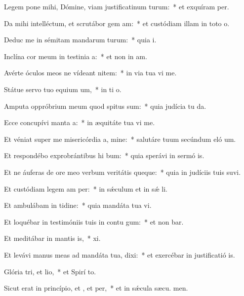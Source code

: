 \item Legem pone mihi, Dómine, viam justificatinum turum:~* et exquíram  per.
\item Da mihi intelléctum, et scrutábor gem am:~* et custódiam illam in toto  o.
\item Deduc me in sémitam mandarum turum:~* quia  i.
\item Inclína cor meum in testinia a:~* et non in am.
\item Avérte óculos meos ne vídeant nitem:~* in via tua vi me.
\item Státue servo tuo equium um,~* in ti o.
\item Amputa oppróbrium meum quod spitus sum:~* quia judícia tu da.
\item Ecce concupívi manta a:~* in æquitáte tua vi me.
\item Et véniat super me misericórdia a, mine:~* salutáre tuum secúndum eló um.
\item Et respondébo exprobrántibus hi bum:~* quia sperávi in sermó is.
\item Et ne áuferas de ore meo verbum veritátis queque:~* quia in judíciis tuis suvi.
\item Et custódiam legem am per:~* in sǽculum et in sǽ li.
\item Et ambulábam in tidine:~* quia mandáta tua vi.
\item Et loquébar in testimóniis tuis in contu gum:~* et non bar.
\item Et meditábar in mantis is,~*  xi.
\item Et levávi manus meas ad mandáta tua,  dixi:~* et exercébar in justificatió is.
\item Glória tri, et lio,~* et Spirí to.
\item Sicut erat in princípio, et , et per,~* et in sǽcula sæcu. men.
